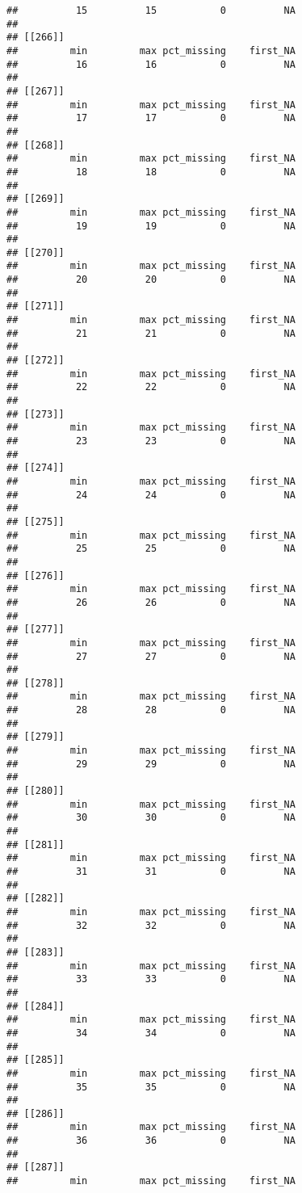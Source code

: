 \documentclass[
]{article}
\begin{document}
\begin{verbatim}
##          15          15           0          NA 
## 
## [[266]]
##         min         max pct_missing    first_NA 
##          16          16           0          NA 
## 
## [[267]]
##         min         max pct_missing    first_NA 
##          17          17           0          NA 
## 
## [[268]]
##         min         max pct_missing    first_NA 
##          18          18           0          NA 
## 
## [[269]]
##         min         max pct_missing    first_NA 
##          19          19           0          NA 
## 
## [[270]]
##         min         max pct_missing    first_NA 
##          20          20           0          NA 
## 
## [[271]]
##         min         max pct_missing    first_NA 
##          21          21           0          NA 
## 
## [[272]]
##         min         max pct_missing    first_NA 
##          22          22           0          NA 
## 
## [[273]]
##         min         max pct_missing    first_NA 
##          23          23           0          NA 
## 
## [[274]]
##         min         max pct_missing    first_NA 
##          24          24           0          NA 
## 
## [[275]]
##         min         max pct_missing    first_NA 
##          25          25           0          NA 
## 
## [[276]]
##         min         max pct_missing    first_NA 
##          26          26           0          NA 
## 
## [[277]]
##         min         max pct_missing    first_NA 
##          27          27           0          NA 
## 
## [[278]]
##         min         max pct_missing    first_NA 
##          28          28           0          NA 
## 
## [[279]]
##         min         max pct_missing    first_NA 
##          29          29           0          NA 
## 
## [[280]]
##         min         max pct_missing    first_NA 
##          30          30           0          NA 
## 
## [[281]]
##         min         max pct_missing    first_NA 
##          31          31           0          NA 
## 
## [[282]]
##         min         max pct_missing    first_NA 
##          32          32           0          NA 
## 
## [[283]]
##         min         max pct_missing    first_NA 
##          33          33           0          NA 
## 
## [[284]]
##         min         max pct_missing    first_NA 
##          34          34           0          NA 
## 
## [[285]]
##         min         max pct_missing    first_NA 
##          35          35           0          NA 
## 
## [[286]]
##         min         max pct_missing    first_NA 
##          36          36           0          NA 
## 
## [[287]]
##         min         max pct_missing    first_NA 

\end{verbatim}
\end{document}
